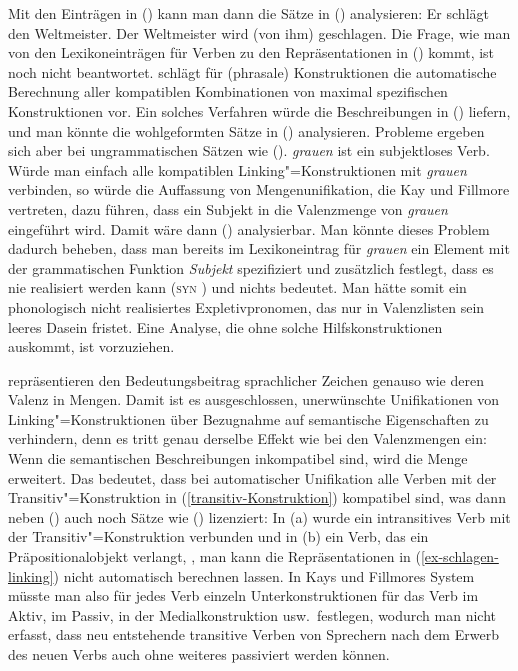 \zl
Mit den Einträgen in () kann man dann die Sätze in () analysieren:
\eal
\ex Er schlägt den Weltmeister.
\ex Der Weltmeister wird (von ihm) geschlagen.
\zl
Die Frage, wie man von den Lexikoneinträgen für Verben zu den Repräsentationen in ()
kommt, ist noch nicht beantwortet. \citet{Kay2002a} schlägt für (phrasale) Konstruktionen
die automatische Berechnung aller kompatiblen Kombinationen von maximal spezifischen
Konstruktionen vor. Ein solches Verfahren würde die Beschreibungen in () liefern,
und man könnte die wohlgeformten Sätze in () analysieren.
Probleme ergeben sich aber bei ungrammatischen Sätzen wie (). \emph{grauen} ist ein
subjektloses Verb. Würde man einfach alle kompatiblen Linking"=Konstruktionen mit \emph{grauen}
verbinden, so würde die Auffassung von Mengenunifikation, die Kay und Fillmore vertreten, dazu führen,
dass ein Subjekt in die Valenzmenge von \emph{grauen} eingeführt wird. Damit wäre dann ()
analysierbar.
\z
Man könnte dieses Problem dadurch beheben, dass man bereits im Lexikoneintrag für \emph{grauen}
ein Element mit der grammatischen Funktion \emph{Subjekt} spezifiziert und zusätzlich festlegt,
dass es nie realisiert werden kann (\textsc{syn} ) und nichts bedeutet. Man hätte somit
ein phonologisch nicht realisiertes Expletivpronomen, das nur in Valenzlisten sein leeres Dasein
fristet. Eine Analyse, die ohne solche Hilfskonstruktionen auskommt, ist vorzuziehen.

\citet{KF99a} repräsentieren den Bedeutungsbeitrag sprachlicher Zeichen genauso wie deren Valenz in Mengen.
Damit ist es ausgeschlossen, unerwünschte Unifikationen von Linking"=Konstruktionen über Bezugnahme
auf semantische Eigenschaften zu verhindern, denn es tritt genau derselbe Effekt wie bei den
Valenzmengen ein: Wenn die semantischen Beschreibungen inkompatibel sind, wird die Menge erweitert. Das bedeutet, dass bei
automatischer Unifikation alle Verben mit der Transitiv"=Konstruktion in (\ref{transitiv-Konstruktion}) kompatibel sind,
was dann neben () auch noch Sätze wie () lizenziert:
\eal
{}
\zl
In (a) wurde ein intransitives Verb mit der Transitiv"=Konstruktion verbunden und in
(b) ein Verb, das ein Präpositionalobjekt verlangt, \dash, man kann die Repräsentationen in
(\ref{ex-schlagen-linking}) nicht automatisch berechnen lassen. In Kays und Fillmores System müsste
man also für jedes Verb einzeln Unterkonstruktionen für das Verb im Aktiv, im Passiv, in der
Medialkonstruktion usw.\ festlegen, wodurch man nicht erfasst, dass neu entstehende transitive Verben
von Sprechern nach dem Erwerb des neuen Verbs auch ohne weiteres passiviert werden können.%
%

